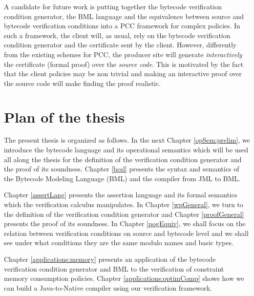 \begin{description}
     A candidate for future work is putting together the bytecode verification condition generator, 
     the  BML language and the equivalence between source and bytecode verification conditions into a PCC framework for complex policies.
     In such a framework, the client
     will, as usual, rely  on the bytecode verification condition generator and  the certificate sent by the client. 
     However, differently from the existing schemes for PCC, the producer site will generate \textit{interactively} the certificate (formal proof) 
     over the \textit{source code}. This is motivated by the fact that the client policies may be non trivial and making an interactive proof over the source
     code will make finding the proof realistic.

\end{description}





\section{Plan of the thesis}


The present thesis is organized as follows. In the next Chapter \ref{opSem:prelim}, we introduce
 the bytecode language and its operational semantics which will be used all along the thesis for the definition of the verification condition generator and the proof
of its soundness. 
Chapter \ref{bcsl} presents the syntax and semantics of the Bytecode Modeling Language (BML) and the compiler from JML to BML. 

Chapter \ref{assertLang} presents the assertion language and its formal semantics which the verification calculus manipulates. 
In Chapter \ref{wpGeneral}, we turn to the definition of the verification condition generator and Chapter \ref{proofGeneral}
 presents the proof of its soundness. In Chapter \ref{pogEquiv}, we shall focus on the relation between 
verification conditions on source and bytecode level and we shall see under what conditions they are the same modulo names and basic types.
   
Chapter \ref{applications:memory} presents an application of the bytecode verification condition generator and BML to the verification of constraint memory consumption
policies. Chapter \ref{applications:optimComp} shows how we can build a Java-to-Native compiler using our verification framework.




